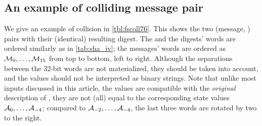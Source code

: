 \subsection{An example of colliding message pair}
\label{sec:colli_ex}
We give an example of collision in \autoref{tbl:fscoll76}.
This shows the two (message, \iv) pairs with their (identical) resulting digest. The \ivs and the digests' words are ordered similarly
as in \autoref{tab:sha_iv}; the messages' words are ordered as $\mathcal{M}_0,\ldots,\mathcal{M}_{15}$ from top to bottom, left to right.
Although the separations between the 32-bit words are not materialized, they should be taken into account, and
the values should not be interpreted as binary strings.
Note that unlike most inputs discussed in this article, the \iv values are compatible with the \emph{original} description
of \shaone, \ie they are not (all) equal to the corresponding state values $\mathcal{A}_{0},\ldots,\mathcal{A}_{-4}$; compared to
$\mathcal{A}_{-2},\ldots,\mathcal{A}_{-4}$, the last three \iv words are rotated by two to the right.

